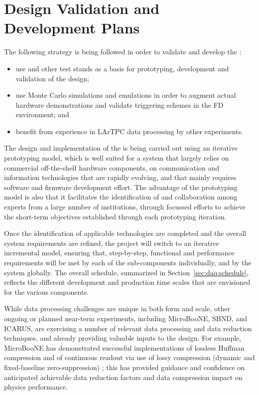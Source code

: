 \section{Design Validation and Development Plans}
\label{sec:daq:validation}

The following strategy is being followed in order to validate and
develop the   :
\begin{itemize}
\item use  and other test stands as a basis for prototyping, development and validation of the  design; 
\item use Monte Carlo simulations and emulations in order to augment actual hardware
demonstrations and validate triggering schemes in the FD environment; and 
\item benefit from experience in LArTPC data processing by other experiments.
\end{itemize}


The design and implementation of the  is being carried out using an iterative prototyping model, which is well suited for a system that largely relies on commercial off-the-shelf hardware components, on communication and information technologies that are rapidly evolving, and that mainly requires software and firmware development effort.
The advantage of the prototyping model is also that it facilitates the identification of and collaboration among experts from a large number of institutions, through focussed efforts to achieve the short-term objectives established through each prototyping iteration.

Once the identification of applicable technologies are completed and the overall system requirements are refined, 
the project will switch to an iterative incremental model, ensuring that, step-by-step,
functional and performance requirements will be met by each of the sub-components individually, and by the  system globally.
The overall schedule, summarized in Section~\ref{sec:daq:schedule},
reflects the different development and production time scales that are
envisioned for the various  components.

While  data processing challenges are unique in both form
and scale, other ongoing or planned near-term 
experiments, including MicroBooNE, SBND, and ICARUS, are exercising
a number of relevant data processing and data reduction techniques, and already providing valuable
inputs to the    design. For example,
MicroBooNE has demonstrated successful implementations of lossless Huffman
compression and of continuous readout via use of lossy compression
(dynamic and fixed-baseline zero-suppression)
\cite{bib:uBsnreadout2019}; this has provided guidance and 
confidence on anticipated achievable data reduction factors and data compression
impact on physics performance.


